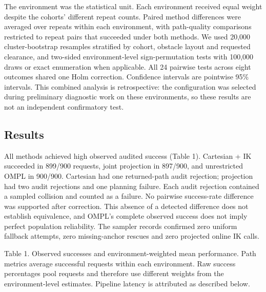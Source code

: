 The environment was the statistical unit. Each environment received equal weight despite the cohorts' different repeat counts. Paired method differences were averaged over repeats within each environment, with path-quality comparisons restricted to repeat pairs that succeeded under both methods. We used 20,000 cluster-bootstrap resamples stratified by cohort, obstacle layout and requested clearance, and two-sided environment-level sign-permutation tests with 100,000 draws or exact enumeration when applicable. All 24 pairwise tests across eight outcomes shared one Holm correction. Confidence intervals are pointwise 95\% intervals. This combined analysis is retrospective: the configuration was selected during preliminary diagnostic work on these environments, so these results are not an independent confirmatory test.

\hypertarget{results}{%
\subsection{Results}\label{results}}

All methods achieved high observed audited success (Table 1). Cartesian + IK succeeded in 899/900 requests, joint projection in 897/900, and unrestricted OMPL in 900/900. Cartesian had one returned-path audit rejection; projection had two audit rejections and one planning failure. Each audit rejection contained a sampled collision and counted as a failure. No pairwise success-rate difference was supported after correction. This absence of a detected difference does not establish equivalence, and OMPL's complete observed success does not imply perfect population reliability. The sampler records confirmed zero uniform fallback attempts, zero missing-anchor rescues and zero projected online IK calls.

Table 1. Observed successes and environment-weighted mean performance. Path metrics average successful requests within each environment. Raw success percentages pool requests and therefore use different weights from the environment-level estimates. Pipeline latency is attributed as described below.

